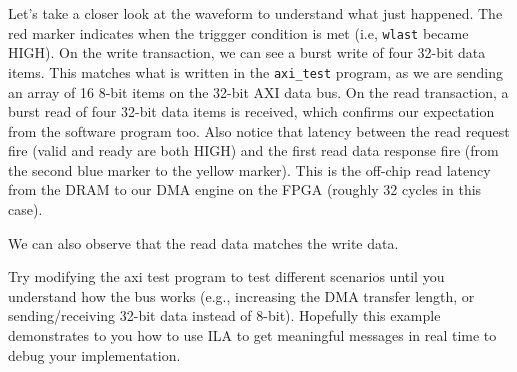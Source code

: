 \documentclass[11pt]{article}
\begin{document}
\begin{center}
\end{center}

Let's take a closer look at the waveform to understand what just happened. The red marker indicates when the triggger condition is met (i.e, \verb|wlast| became HIGH). On the write transaction, we can see a burst write of four 32-bit data items. This matches what is written in the \verb|axi_test| program, as we are sending an array of 16 8-bit items on the 32-bit AXI data bus. On the read transaction, a burst read of four 32-bit data items is received, which confirms our expectation from the software program too. Also notice that latency between the read request fire (valid and ready are both HIGH) and the first read data response fire (from the second blue marker to the yellow marker). This is the off-chip read latency from the DRAM to our DMA engine on the FPGA (roughly 32 cycles in this case).

\begin{center}
\end{center}

We can also observe that the read data matches the write data.

\begin{center}
\end{center}

Try modifying the axi test program to test different scenarios until you understand how the bus works (e.g., increasing the DMA transfer length, or sending/receiving 32-bit data instead of 8-bit). Hopefully this example demonstrates to you how to use ILA to get meaningful messages in real time to debug your implementation.
\end{document}
